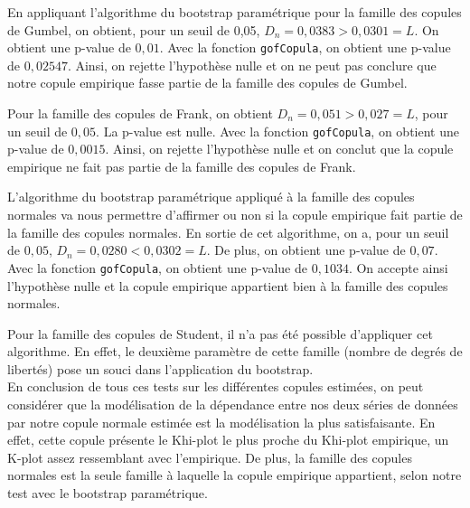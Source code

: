 En appliquant l'algorithme du bootstrap paramétrique pour la famille des copules de Gumbel, on obtient, pour un seuil de 0,05, $D_n = 0,0383 > 0,0301 = L$. On obtient une p-value de $0,01$. Avec la fonction \lstinline!gofCopula!, on obtient une p-value de $0,02547$. 
Ainsi, on rejette l'hypothèse nulle et on ne peut pas conclure que notre copule empirique fasse partie de la famille des copules de Gumbel.

Pour la famille des copules de Frank, on obtient $D_n = 0,051 > 0,027 = L$, pour un seuil de $0,05$. La p-value est nulle. Avec la fonction \lstinline!gofCopula!, on obtient une p-value de $0,0015$. 
Ainsi, on rejette l'hypothèse nulle et on conclut que la copule empirique ne fait pas partie de la famille des copules de Frank.

L'algorithme du bootstrap paramétrique appliqué à la famille des copules normales va nous permettre d'affirmer ou non si la copule empirique fait partie de la famille des copules normales. En sortie de cet algorithme, on a, pour un seuil de $0,05$, $D_n = 0,0280 < 0,0302 = L$. De plus, on obtient une p-value de $0,07$. Avec la fonction \lstinline!gofCopula!, on obtient une p-value de $0,1034$. 
On accepte ainsi l'hypothèse nulle et la copule empirique appartient bien à la famille des copules normales.

Pour la famille des copules de Student, il n'a pas été possible d'appliquer cet algorithme. En effet, le deuxième paramètre de cette famille (nombre de degrés de libertés) pose un souci dans l'application du bootstrap. \\ 


En conclusion de tous ces tests sur les différentes copules estimées, on peut considérer que la modélisation de la dépendance entre nos deux séries de données par notre copule normale estimée est la modélisation la plus satisfaisante. En effet, cette copule présente le Khi-plot le plus proche du Khi-plot empirique, un K-plot assez ressemblant avec l'empirique. De plus, la famille des copules normales est la seule famille à laquelle la copule empirique appartient, selon notre test avec le bootstrap paramétrique.




